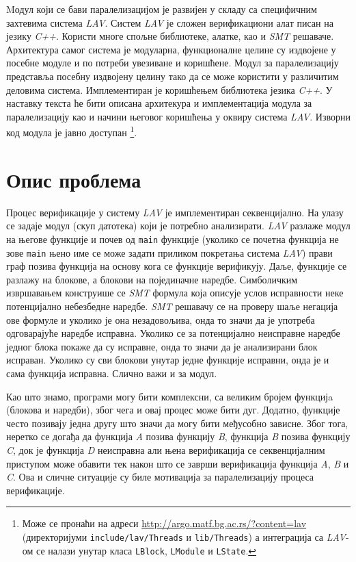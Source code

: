 \documentclass[12pt,oneside]{memoir}
\begin{document}
Mодул који се бави паралелизацијом је развијен у складу са специфичним захтевима система \textit{LAV}. Систем \textit{LAV} је сложен верификациони алат писан на језику \textit{C++}. Користи многе спољне библиотеке, алатке, као и \textit{SMT} решаваче.  Архитектура самог система је модуларна, функционалне целине су издвојене у посебне модуле и по потреби увезиване и коришћене. Модул за паралелизацију представља посебну издвојену целину тако да се може користити у различитим деловима система. Имплементиран је коришћењем библиотека језика \textit{C++}. У наставку текста ће бити описана архитекура и имплементација модула за паралелизацију као и начини његовог коришћења у оквиру система \textit{LAV}. Изворни код модула је јавно доступан \footnote{Може се пронаћи на адреси \url{http://argo.matf.bg.ac.rs/?content=lav} (директоријуми \texttt{include/lav/Threads} и \texttt{lib/Threads}) а интеграција са \textit{LAV}-ом се налази унутар класа \texttt{LBlock}, \texttt{LModule} и \texttt{LState}.}.  

\section{Опис проблема}
Процес верификације у систему \textit{LAV} је имплементиран секвенцијално. На улазу се задаје модул (скуп датотека) који је потребно анализирати.  \textit{LAV} разлаже модул на његове функције и почев од \texttt{main} функције (уколико се почетна функција не зове \texttt{main} њено име се може задати приликом покретања система \textit{LAV}) прави граф позива функција  на основу кога се функције верификују. Даље, функције се разлажу на блокове, а блокови на појединачне наредбе. Симболичким извршавањем конструише се \textit{SMT} формула која описује услов исправности неке потенцијално небезбедне наредбе. \textit{SMT} решавачу се на проверу шаље негација ове формуле и уколико је она незадовољива, онда то значи да је употреба одговарајуће наредбе исправна. Уколико се за потенцијално неисправне наредбе једног блока покаже да су исправне, онда то значи да је анализирани блок исправан. Уколико су сви блокови унутар једне функције исправни, онда је и сама функција исправна. Слично важи и за модул. 

Као што знамо, програми могу бити комплексни, са великим бројем функцијa (блокова и наредби), због чега и овај процес може бити дуг. Додатно, функције често позивају једна другу што значи да могу бити међусобно зависне. Због тога, неретко се догађа да функција \textit{A} позива функцију \textit{B}, функција \textit{B} позива функцију \textit{C}, док је функција \textit{D} неисправна али њена верификација се секвенцијалним приступом може обавити тек након што се заврши верификација функција \textit{A}, \textit{B} и \textit{C}. Ова и сличне ситуације су биле мотивација за паралелизацију процеса верификације. 
\end{document}
